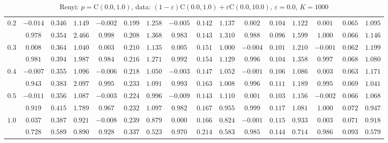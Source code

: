\documentclass[11pt]{article}
\begin{document}
\begin{table}[ht]
\begin{center}
\begin{tabular}{|c|ccc|ccc|ccc|ccc|ccc|}
\hline 
$0.2$ & $ -0.014 $ & $ 0.346 $ & $ 1.149 $ & $ -0.002 $ & $ 0.199 $ & $ 1.258 $ & $ -0.005 $ & $ 0.142 $ & $ 1.137 $ & $ 0.002 $ & $ 0.104 $ & $ 1.122 $ & $ 0.001 $ & $ 0.065 $ & $ 1.095 $\\ 
 & $ 0.978 $ & $ 0.354 $ & $ 2.466 $ & $ 0.998 $ & $ 0.208 $ & $ 1.368 $ & $ 0.983 $ & $ 0.143 $ & $ 1.310 $ & $ 0.988 $ & $ 0.096 $ & $ 1.599 $ & $ 1.000 $ & $ 0.066 $ & $ 1.146 $\\ 
\hline 
$0.3$ & $ 0.008 $ & $ 0.364 $ & $ 1.040 $ & $ 0.003 $ & $ 0.210 $ & $ 1.135 $ & $ 0.005 $ & $ 0.151 $ & $ 1.000 $ & $ -0.004 $ & $ 0.101 $ & $ 1.210 $ & $ -0.001 $ & $ 0.062 $ & $ 1.199 $\\ 
 & $ 0.981 $ & $ 0.394 $ & $ 1.987 $ & $ 0.984 $ & $ 0.216 $ & $ 1.271 $ & $ 0.992 $ & $ 0.154 $ & $ 1.129 $ & $ 0.996 $ & $ 0.104 $ & $ 1.358 $ & $ 0.997 $ & $ 0.068 $ & $ 1.080 $\\ 
\hline 
$0.4$ & $ -0.007 $ & $ 0.355 $ & $ 1.096 $ & $ -0.006 $ & $ 0.218 $ & $ 1.050 $ & $ -0.003 $ & $ 0.147 $ & $ 1.052 $ & $ -0.001 $ & $ 0.106 $ & $ 1.086 $ & $ 0.003 $ & $ 0.063 $ & $ 1.171 $\\ 
 & $ 0.943 $ & $ 0.383 $ & $ 2.097 $ & $ 0.995 $ & $ 0.233 $ & $ 1.091 $ & $ 0.993 $ & $ 0.163 $ & $ 1.008 $ & $ 0.996 $ & $ 0.111 $ & $ 1.189 $ & $ 0.995 $ & $ 0.069 $ & $ 1.041 $\\ 
\hline 
$0.5$ & $ -0.011 $ & $ 0.356 $ & $ 1.087 $ & $ -0.003 $ & $ 0.224 $ & $ 0.996 $ & $ -0.009 $ & $ 0.143 $ & $ 1.110 $ & $ 0.001 $ & $ 0.103 $ & $ 1.156 $ & $ -0.002 $ & $ 0.066 $ & $ 1.068 $\\ 
 & $ 0.919 $ & $ 0.415 $ & $ 1.789 $ & $ 0.967 $ & $ 0.232 $ & $ 1.097 $ & $ 0.982 $ & $ 0.167 $ & $ 0.955 $ & $ 0.999 $ & $ 0.117 $ & $ 1.081 $ & $ 1.000 $ & $ 0.072 $ & $ 0.947 $\\ 
\hline 
$1.0$ & $ 0.037 $ & $ 0.387 $ & $ 0.921 $ & $ -0.008 $ & $ 0.239 $ & $ 0.879 $ & $ 0.000 $ & $ 0.166 $ & $ 0.824 $ & $ -0.001 $ & $ 0.115 $ & $ 0.933 $ & $ 0.003 $ & $ 0.071 $ & $ 0.918 $\\ 
 & $ 0.728 $ & $ 0.589 $ & $ 0.890 $ & $ 0.928 $ & $ 0.337 $ & $ 0.523 $ & $ 0.970 $ & $ 0.214 $ & $ 0.583 $ & $ 0.985 $ & $ 0.144 $ & $ 0.714 $ & $ 0.986 $ & $ 0.093 $ & $ 0.579 $\\ 
\hline 
\end{tabular}
\caption{Renyi: $p = \mathrm{C}(0.0,1.0)$, data: $(1-\varepsilon)\mathrm{C}(0.0,1.0) + \varepsilon \mathrm{C}(0.0,10.0)$, $\varepsilon =  0.0$, $K = 1000$} 
\end{center}
\end{table}
\end{document}
